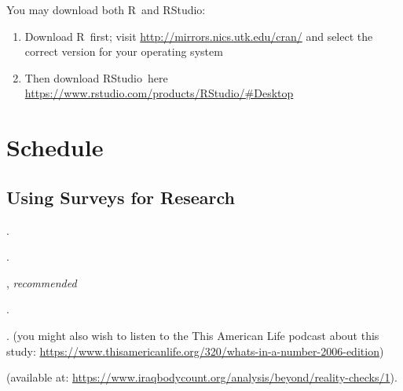 \documentclass[11pt]{syllabus}
\newcommand{\R}{\textsf{R}}
\newcommand{\RStudio}{\textsf{RStudio}}
\begin{document}
You may download both \R\ and \RStudio: 
\begin{enumerate}
\item Download \R\ first; visit \url{http://mirrors.nics.utk.edu/cran/} and select the correct version for your operating system
\item Then download \RStudio\ here \url{https://www.rstudio.com/products/RStudio/#Desktop}
\end{enumerate}

\section{Schedule}

\subsection{Using Surveys for Research}
\begin{readings}
\item {}.
\end{readings}

\begin{readings}
\item {}. 
\item {}
\item {}, \textit{recommended}
\end{readings}

\begin{readings}
\item {}. 
\item {}. (you might also wish to listen to the This American Life podcast about this study: \url{https://www.thisamericanlife.org/320/whats-in-a-number-2006-edition})
\item {} (available at: \url{https://www.iraqbodycount.org/analysis/beyond/reality-checks/1}).
\end{readings}
\end{document}
